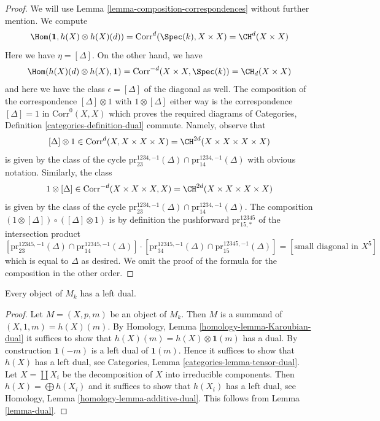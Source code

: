 \begin{proof}
We will use Lemma \ref{lemma-composition-correspondences}
without further mention. We compute
$$
\Hom(\mathbf{1}, h(X) \otimes h(X)(d)) =
\text{Corr}^d(\Spec(k), X \times X) = \CH^d(X \times X)
$$
Here we have $\eta = [\Delta]$. On the other hand, we have
$$
\Hom(h(X)(d) \otimes h(X), \mathbf{1}) =
\text{Corr}^{-d}(X \times X, \Spec(k)) = \CH_d(X \times X)
$$
and here we have the class $\epsilon = [\Delta]$
of the diagonal as well. The composition of the correspondence
$[\Delta] \otimes 1$ with $1 \otimes [\Delta]$ either way
is the correspondence $[\Delta] = 1$ in $\text{Corr}^0(X, X)$ which proves
the required diagrams of
Categories, Definition \ref{categories-definition-dual} commute.
Namely, observe that
$$
[\Delta] \otimes 1 \in \text{Corr}^d(X, X \times X \times X) =
\CH^{2d}(X \times X \times X \times X)
$$
is given by the class of the cycle
$\text{pr}^{1234, -1}_{23}(\Delta) \cap \text{pr}^{1234, -1}_{14}(\Delta)$ with
obvious notation. Similarly, the class
$$
1 \otimes [\Delta] \in \text{Corr}^{-d}(X \times X \times X, X) =
\CH^{2d}(X \times X \times X \times X)
$$
is given by the class of the cycle
$\text{pr}^{1234, -1}_{23}(\Delta) \cap \text{pr}^{1234, -1}_{14}(\Delta)$.
The composition $(1 \otimes [\Delta]) \circ ([\Delta] \otimes 1)$
is by definition the pushforward $\text{pr}^{12345}_{15, *}$
of the intersection product
$$
[\text{pr}^{12345, -1}_{23}(\Delta) \cap \text{pr}^{12345, -1}_{14}(\Delta)]
\cdot
[\text{pr}^{12345, -1}_{34}(\Delta) \cap \text{pr}^{12345, -1}_{15}(\Delta)]
=
[\text{small diagonal in } X^5]
$$
which is equal to $\Delta$ as desired. We omit the proof of the formula
for the composition in the other order.
\end{proof}

\begin{lemma}
\label{lemma-dual-general}
Every object of $M_k$ has a left dual.
\end{lemma}

\begin{proof}
Let $M = (X, p, m)$ be an object of $M_k$. Then $M$ is a summand of
$(X, 1, m) = h(X)(m)$.
By Homology, Lemma \ref{homology-lemma-Karoubian-dual}
it suffices to show that
$h(X)(m) = h(X) \otimes \mathbf{1}(m)$ has a dual.
By construction $\mathbf{1}(-m)$ is a left dual of $\mathbf{1}(m)$.
Hence it suffices to show that $h(X)$ has a left dual, see
Categories, Lemma \ref{categories-lemma-tensor-dual}.
Let $X = \coprod X_i$ be the decomposition of $X$ into
irreducible components. Then $h(X) = \bigoplus h(X_i)$
and it suffices to show that $h(X_i)$ has a left dual, see
Homology, Lemma \ref{homology-lemma-additive-dual}.
This follows from Lemma \ref{lemma-dual}.
\end{proof}







